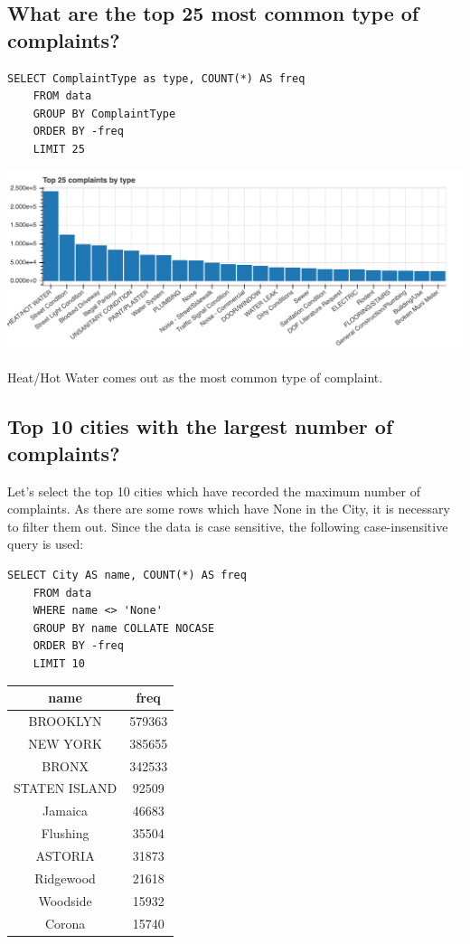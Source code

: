 \documentclass[12pt,a4paper]{article}
\begin{document}
\subsection{What are the top 25 most common type of complaints?}  \label{top25}
\begin{verbatim}
SELECT ComplaintType as type, COUNT(*) AS freq
    FROM data
    GROUP BY ComplaintType
    ORDER BY -freq
    LIMIT 25
\end{verbatim}

\includegraphics[scale=0.3]{top25complaints}

Heat/Hot Water comes out as the most common type of complaint.

\subsection{Top 10 cities with the largest number of complaints?}  \label{top10cities}
Let's select the top 10 cities which have recorded the maximum number of complaints. As there are some rows which have None in the City, it is necessary to filter them out. Since the data is case sensitive, the following case-insensitive query is used:

\begin{verbatim}
SELECT City AS name, COUNT(*) AS freq
    FROM data
    WHERE name <> 'None'
    GROUP BY name COLLATE NOCASE
    ORDER BY -freq
    LIMIT 10
\end{verbatim}

\begin{center}
 \begin{tabular}{||c c||}
 \hline
 name & freq \\ [0.5ex]
 \hline\hline
BROOKLYN    & 579363 \\
NEW YORK    & 385655 \\
BRONX   & 342533 \\
STATEN ISLAND   & 92509 \\
Jamaica & 46683 \\
Flushing    & 35504 \\
ASTORIA & 31873 \\
Ridgewood   & 21618 \\
Woodside    & 15932 \\
Corona  & 15740 \\ [1ex]
 \hline
\end{tabular}
\end{center}
\end{document}
